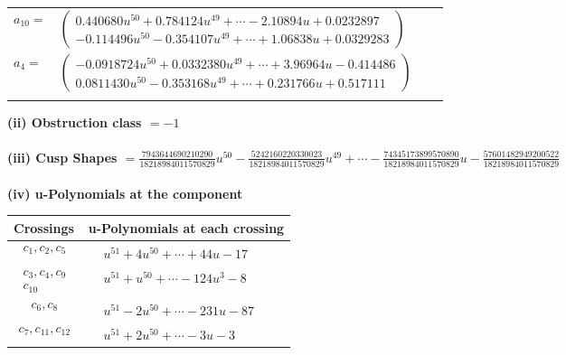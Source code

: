 \documentclass[1p]{elsarticle_modified}
\theoremstyle{definition}
\begin{document}
\begin{tabular}{m{7pt} m{180pt} m{7pt} m{180pt} }
\flushright $a_{10}=$&$\begin{pmatrix}0.440680 u^{50}+0.784124 u^{49}+\cdots-2.10894 u+0.0232897\\-0.114496 u^{50}-0.354107 u^{49}+\cdots+1.06838 u+0.0329283\end{pmatrix}$ \\
\flushright $a_{4}=$&$\begin{pmatrix}-0.0918724 u^{50}+0.0332380 u^{49}+\cdots+3.96964 u-0.414486\\0.0811430 u^{50}-0.353168 u^{49}+\cdots+0.231766 u+0.517111\end{pmatrix}$\\&\end{tabular}
\flushleft \textbf{(ii) Obstruction class $= -1$}\\~\\
\flushleft \textbf{(iii) Cusp Shapes $= \frac{7943644690210290}{18218984011570829} u^{50}-\frac{5242160220330023}{18218984011570829} u^{49}+\cdots-\frac{74345173899570890}{18218984011570829} u-\frac{57601482949200522}{18218984011570829}$}\\~\\
\newpage\renewcommand{\arraystretch}{1}
\flushleft \textbf{(iv) u-Polynomials at the component}\newline \\
\begin{tabular}{m{50pt}|m{274pt}}
Crossings & \hspace{64pt}u-Polynomials at each crossing \\
\hline $$\begin{aligned}c_{1},c_{2},c_{5}\end{aligned}$$&$\begin{aligned}
&u^{51}+4 u^{50}+\cdots+44 u-17
\end{aligned}$\\
\hline $$\begin{aligned}c_{3},c_{4},c_{9}\\c_{10}\end{aligned}$$&$\begin{aligned}
&u^{51}+u^{50}+\cdots-124 u^3-8
\end{aligned}$\\
\hline $$\begin{aligned}c_{6},c_{8}\end{aligned}$$&$\begin{aligned}
&u^{51}-2 u^{50}+\cdots-231 u-87
\end{aligned}$\\
\hline $$\begin{aligned}c_{7},c_{11},c_{12}\end{aligned}$$&$\begin{aligned}
&u^{51}+2 u^{50}+\cdots-3 u-3
\end{aligned}$\\
\hline
\end{tabular}\\~\\
\end{document}
